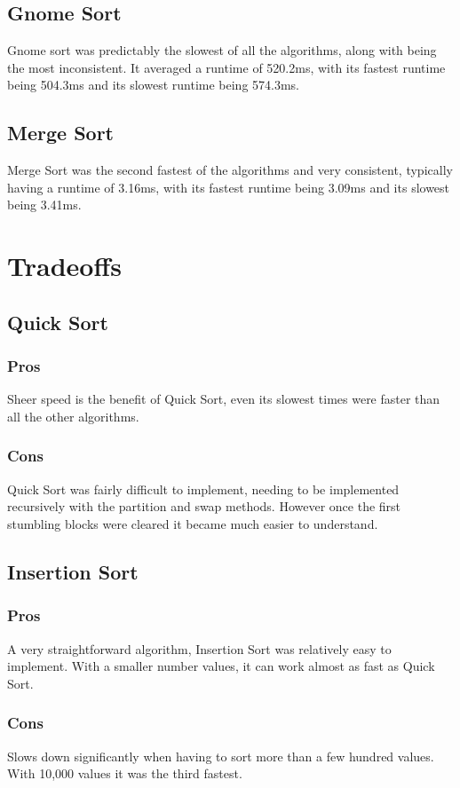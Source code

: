 \documentclass[conference]{IEEEtran}
\begin{document}
\subsection{Gnome Sort}
Gnome sort was predictably the slowest of all the algorithms, along with being the most inconsistent. It averaged a runtime of 520.2ms, with its fastest runtime being 504.3ms and its slowest runtime being 574.3ms.

\subsection{Merge Sort}
Merge Sort was the second fastest of the algorithms and very consistent, typically having a runtime of 3.16ms, with its fastest runtime being 3.09ms and its slowest being 3.41ms.

\section{Tradeoffs}

\subsection{Quick Sort}
\subsubsection{Pros}
Sheer speed is the benefit of Quick Sort, even its slowest times were faster than all the other algorithms.
\subsubsection{Cons}
Quick Sort was fairly difficult to implement, needing to be implemented recursively with the partition and swap methods. However once the first stumbling blocks were cleared it became much easier to understand.

\subsection{Insertion Sort}
\subsubsection{Pros}
A very straightforward algorithm, Insertion Sort was relatively easy to implement. With a smaller number values, it can work almost as fast as Quick Sort.
\subsubsection{Cons}
Slows down significantly when having to sort more than a few hundred values. With 10,000 values it was the third fastest.
\end{document}
